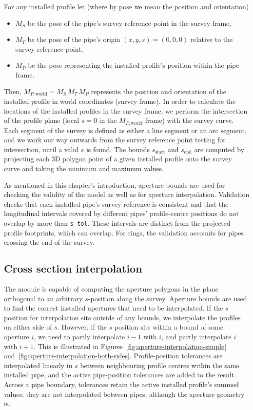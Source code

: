 For any installed profile let (where by pose we mean the position and orientation)
\begin{itemize}
	\item $M_S$ be the pose of the pipe's survey reference point in the survey frame,
	\item $M_T$ be the pose of the pipe's origin $(x, y, s) = (0, 0, 0)$ relative to the survey reference point,
	\item $M_P$ be the pose representing the installed profile's position within the pipe frame.
\end{itemize}
Then, $M_{P,\mathrm{world}} = M_S \, M_T \, M_P$ represents the position and orientation of the installed profile in world coordinates (survey frame).
In order to calculate the locations of the installed profiles in the survey frame, we perform the intersection of the profile plane (local $s = 0$ in the $M_{P,\mathrm{world}}$ frame) with the survey curve.
Each segment of the survey is defined as either a line segment or an arc segment, and we work our way outwards from the survey reference point testing for intersection, until a valid $s$ is found.
The bounds $s_\mathrm{start}$ and $s_\mathrm{end}$ are computed by projecting each 3D polygon point of a given installed profile onto the survey curve and taking the minimum and maximum values.

As mentioned in this chapter's introduction, aperture bounds are used for checking the validity of the model as well as for aperture interpolation.
Validation checks that each installed pipe's survey reference is consistent and that
the longitudinal intervals covered by different pipes' profile-centre positions do not
overlap by more than \lstinline{s_tol}.
These intervals are distinct from the projected profile footprints, which can overlap.
For rings, the validation accounts for pipes crossing the end of the survey.

\subsection{Cross section interpolation}

The module is capable of computing the aperture polygons in the plane orthogonal to an arbitrary $s$-position along the survey.
Aperture bounds are used to find the correct installed apertures that need to be interpolated.
If the $s$ position for interpolation sits outside of any bounds, we interpolate the profiles on either side of $s$.
However, if the $s$ position sits within a bound of some aperture $i$, we need to partly interpolate $i - 1$ with $i$, and partly interpolate $i$ with $i + 1$.
This is illustrated in Figures~\ref{fig:aperture-interpolation-simple} and~\ref{fig:aperture-interpolation-both-sides}.
Profile-position tolerances are interpolated linearly in $s$ between neighbouring
profile centres within the same installed pipe, and the active pipe-position tolerances
are added to the result.
Across a pipe boundary, tolerances retain the active installed profile's summed values;
they are not interpolated between pipes, although the aperture geometry is.

